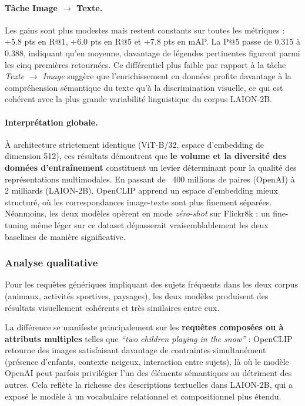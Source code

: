 \documentclass[a4paper,11pt]{article}
\begin{document}
\paragraph{Tâche Image $\rightarrow$ Texte.}
Les gains sont plus modestes mais restent constants sur toutes
les métriques : +5.8 pts en R@1, +6.0 pts en R@5 et +7.8 pts en mAP.
La P@5 passe de 0.315 à 0.388, indiquant qu'en moyenne, davantage
de légendes pertinentes figurent parmi les cinq premières retournées.
Ce différentiel plus faible par rapport à la tâche
\textit{Texte $\rightarrow$ Image} suggère que l'enrichissement
en données profite davantage à la compréhension sémantique du texte
qu'à la discrimination visuelle, ce qui est cohérent avec la plus
grande variabilité linguistique du corpus LAION-2B.
 
\paragraph{Interprétation globale.}
À architecture strictement identique (ViT-B/32, espace d'embedding
de dimension 512), ces résultats démontrent que \textbf{le volume
et la diversité des données d'entraînement} constituent un levier
déterminant pour la qualité des représentations multimodales.
En passant de ~400 millions de paires (OpenAI) à 2 milliards (LAION-2B),
OpenCLIP apprend un espace d'embedding mieux structuré,
où les correspondances image-texte sont plus finement séparées.
Néanmoins, les deux modèles opèrent en mode \textit{zéro-shot} sur
Flickr8k : un fine-tuning même léger sur ce dataset dépasserait
vraisemblablement les deux baselines de manière significative.
 
\subsubsection{Analyse qualitative}
 

Pour les requêtes génériques impliquant des sujets fréquents
dans les deux corpus (animaux, activités sportives, paysages),
les deux modèles produisent des résultats visuellement cohérents
et très similaires entre eux.
 
La différence se manifeste principalement sur les \textbf{requêtes
composées ou à attributs multiples} telles que
\textit{``two children playing in the snow''} : OpenCLIP retourne
des images satisfaisant davantage de contraintes simultanément
(présence d'enfants, contexte neigeux, interaction entre sujets),
là où le modèle OpenAI peut parfois privilégier l'un des éléments
sémantiques au détriment des autres.
Cela reflète la richesse des descriptions textuelles dans LAION-2B,
qui a exposé le modèle à un vocabulaire relationnel et
compositionnel plus étendu.
 
\end{document}
